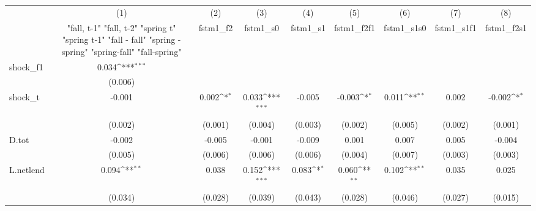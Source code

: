{
\def\sym#1{\ifmmode^{#1}\else\(^{#1}\)\fi}
\begin{tabular}{l*{8}{c}}
\toprule
            &\multicolumn{1}{c}{(1)}&\multicolumn{1}{c}{(2)}&\multicolumn{1}{c}{(3)}&\multicolumn{1}{c}{(4)}&\multicolumn{1}{c}{(5)}&\multicolumn{1}{c}{(6)}&\multicolumn{1}{c}{(7)}&\multicolumn{1}{c}{(8)}\\
            &\multicolumn{1}{c}{  "fall, t-1" "fall, t-2" "spring t" "spring t-1"  "fall - fall" "spring - spring" "spring-fall" "fall-spring" }&\multicolumn{1}{c}{fstm1\_f2}&\multicolumn{1}{c}{fstm1\_s0}&\multicolumn{1}{c}{fstm1\_s1}&\multicolumn{1}{c}{fstm1\_f2f1}&\multicolumn{1}{c}{fstm1\_s1s0}&\multicolumn{1}{c}{fstm1\_s1f1}&\multicolumn{1}{c}{fstm1\_f2s1}\\
\midrule
shock\_f1    &       0.034\sym{***}&                     &                     &                     &                     &                     &                     &                     \\
            &     (0.006)         &                     &                     &                     &                     &                     &                     &                     \\
\addlinespace
shock\_t     &      -0.001         &       0.002\sym{*}  &       0.033\sym{***}&      -0.005         &      -0.003\sym{*}  &       0.011\sym{**} &       0.002         &      -0.002\sym{*}  \\
            &     (0.002)         &     (0.001)         &     (0.004)         &     (0.003)         &     (0.002)         &     (0.005)         &     (0.002)         &     (0.001)         \\
\addlinespace
D.tot       &      -0.002         &      -0.005         &      -0.001         &      -0.009         &       0.001         &       0.007         &       0.005         &      -0.004         \\
            &     (0.005)         &     (0.006)         &     (0.006)         &     (0.006)         &     (0.004)         &     (0.007)         &     (0.003)         &     (0.003)         \\
\addlinespace
L.netlend   &       0.094\sym{**} &       0.038         &       0.152\sym{***}&       0.083\sym{*}  &       0.060\sym{**} &       0.102\sym{**} &       0.035         &       0.025         \\
            &     (0.034)         &     (0.028)         &     (0.039)         &     (0.043)         &     (0.028)         &     (0.046)         &     (0.027)         &     (0.015)         \\

\end{tabular}}
